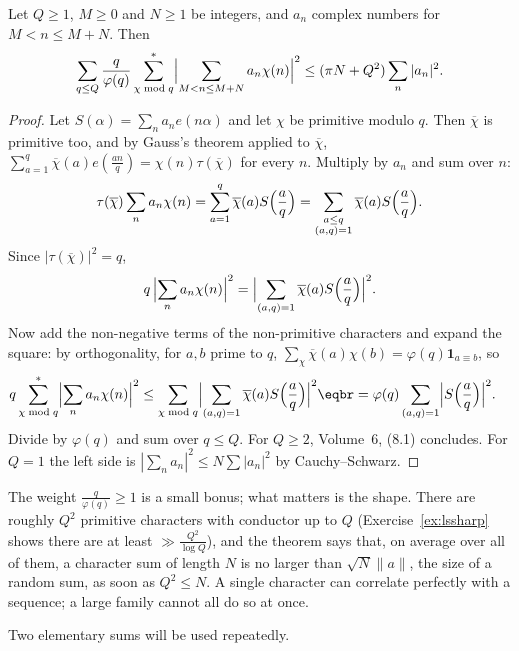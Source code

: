 \begin{theorem}\label{thm:lschar}
Let $Q\ge1$, $M\ge0$ and $N\ge1$ be integers, and $a_n$ complex numbers for $M<n\le M+N$. Then
\[
\sum_{q\le Q}\frac q{\varphi(q)}\sum^*_{\chi\bmod q}\Bigl|\sum_{M<n\le M+N}a_n\chi(n)\Bigr|^2\le(\pi N+Q^2)\sum_n|a_n|^2.
\]
\end{theorem}
\begin{proof}
Let $S(\alpha)=\sum_na_ne(n\alpha)$ and let $\chi$ be primitive modulo $q$. Then $\overline\chi$ is primitive too, and by Gauss's theorem applied to $\overline\chi$, $\sum_{a=1}^q\overline\chi(a)e(\frac{an}q)=\chi(n)\tau(\overline\chi)$ for every $n$. Multiply by $a_n$ and sum over $n$:
\[
\tau(\overline\chi)\sum_na_n\chi(n)=\sum_{a=1}^q\overline\chi(a)S\Bigl(\frac aq\Bigr)=\sum_{\substack{a\le q\\(a,q)=1}}\overline\chi(a)S\Bigl(\frac aq\Bigr).
\]
Since $|\tau(\overline\chi)|^2=q$,
\[
q\,\Bigl|\sum_na_n\chi(n)\Bigr|^2=\Bigl|\sum_{(a,q)=1}\overline\chi(a)S\Bigl(\frac aq\Bigr)\Bigr|^2.
\]
Now add the non-negative terms of the non-primitive characters and expand the square: by orthogonality, for $a,b$ prime to $q$, $\sum_\chi\overline\chi(a)\chi(b)=\varphi(q)\mathbf 1_{a\equiv b}$, so
\[
\begin{aligned}q\sum^*_{\chi\bmod q}\Bigl|\sum_na_n\chi(n)\Bigr|^2&\le\sum_{\chi\bmod q}\Bigl|\sum_{(a,q)=1}\overline\chi(a)S\Bigl(\frac aq\Bigr)\Bigr|^2\eqbr=\varphi(q)\sum_{(a,q)=1}\Bigl|S\Bigl(\frac aq\Bigr)\Bigr|^2.\end{aligned}
\]
Divide by $\varphi(q)$ and sum over $q\le Q$. For $Q\ge2$, Volume~6, (8.1) concludes. For $Q=1$ the left side is $|\sum_na_n|^2\le N\sum|a_n|^2$ by Cauchy--Schwarz.
\end{proof}

The weight $\frac q{\varphi(q)}\ge1$ is a small bonus; what matters is the shape. There are roughly $Q^2$ primitive characters with conductor up to $Q$ (Exercise~\ref{ex:lssharp} shows there are at least $\gg\frac{Q^2}{\log Q}$), and the theorem says that, on average over all of them, a character sum of length $N$ is no larger than $\sqrt N\|a\|$, the size of a random sum, as soon as $Q^2\le N$. A single character can correlate perfectly with a sequence; a large family cannot all do so at once.

Two elementary sums will be used repeatedly.


